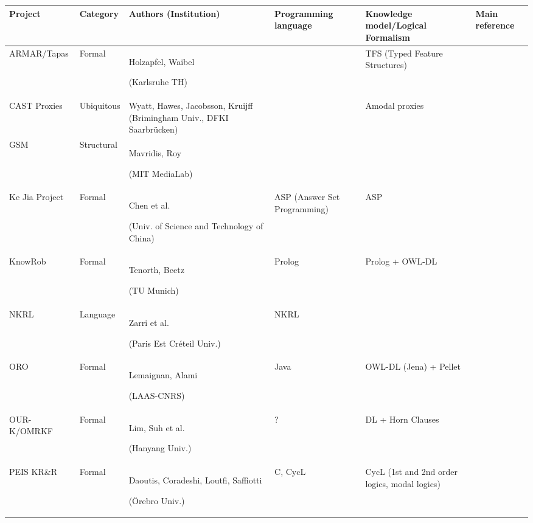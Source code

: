 \documentclass[journal]{IEEEtran}
\begin{document}
\begin{table*}\scriptsize
\begin{center}

\begin{tabular}{p{2.2cm}p{1.6cm}p{4cm}p{2.4cm}p{3.4cm}p{1.5cm}}
\toprule
{\bf Project} & {\bf Category} & {\bf Authors (Institution)} & {\bf Programming language} & {\bf Knowledge model/Logical Formalism} & Main reference \\
\midrule
ARMAR/Tapas & Formal & Holzapfel, Waibel \par (Karlsruhe TH) & & TFS (Typed Feature Structures) & \cite{Holzapfel2008}\\
CAST Proxies & Ubiquitous & Wyatt, Hawes, Jacobsson, Kruijff (Brimingham Univ.,
DFKI Saarbrücken) & & Amodal proxies & \cite{jacobsson2008crossmodal} \\
GSM & Structural & Mavridis, Roy \par (MIT MediaLab) & & & \cite{Mavridis2006} \\
Ke Jia Project & Formal & Chen et al. \par (Univ. of Science and Technology of China) & ASP (Answer Set Programming) & ASP & \cite{Chen2010} \\
{\sc KnowRob} & Formal & Tenorth, Beetz \par (TU Munich) & {\sc Prolog} & {\sc Prolog} + OWL-DL &  \cite{Tenorth2009a} \\
NKRL & Language & Zarri et al. \par (Paris Est Créteil Univ.) & NKRL & & \cite{Sabri2011} \\
ORO & Formal & Lemaignan, Alami \par (LAAS-CNRS) & {\sc Java} & OWL-DL ({\sc Jena}) + {\sc Pellet} & \cite{Lemaignan2010} \\
OUR-K/OMRKF & Formal & Lim, Suh et al. \par (Hanyang Univ.) & ? & DL + Horn Clauses &  \cite{Lim2011, Suh2007} \\
PEIS KR\&R & Formal & Daoutis, Coradeshi, Loutfi, Saffiotti \par (Örebro Univ.) & {\sc C}, {\sc CycL} & CycL (1st and 2nd order logics, modal logics) & \cite{Daoutis2009} \\


\end{tabular}
\end{center}
\end{table*}
\end{document}
